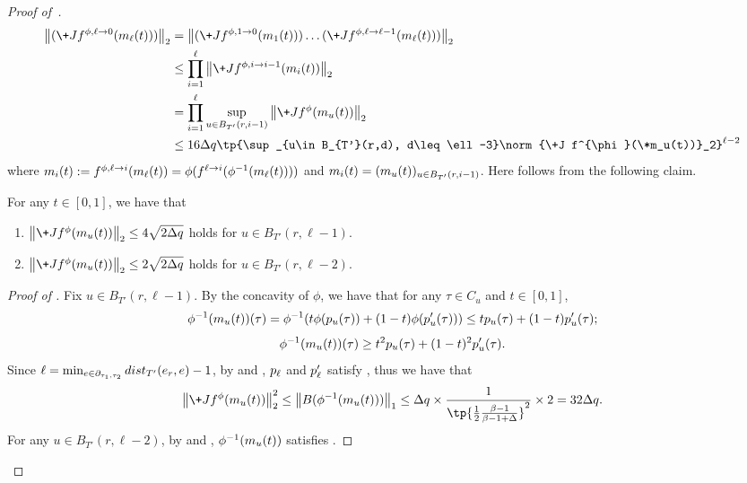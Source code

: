 \begin{proof}[Proof of~]
\begin{align}
    \nonumber \norm{ (\+J f^{\phi,\ell\ra 0}(\*m_\ell(t)))}_2 &= \norm{(\+J f^{\phi,1\ra 0}(\*m_1(t)))\dots (\+J f^{\phi,\ell\ra \ell-1}(\*m_\ell(t)))  }_2
    \\\nonumber &\leq \prod_{i=1}^{\ell}\norm{\+J f^{\phi,i\ra i-1}(\*m_i(t))}_2
    \\\nonumber &= \prod_{i=1}^{\ell}\sup_{u\in B_{T'}(r,i-1)}\norm{\+J f^{\phi}(\*m_u(t))}_2
    \\\label{eq:apply_trivial_bound} &\leq 16\Delta q \tp{\sup_{u\in B_{T'}(r,d), d\leq \ell-3}\norm{\+J f^{\phi}(\*m_u(t))}_2}^{\ell-2}
\end{align}
where $\*m_i(t) := f^{\phi,\ell\ra i}(\*m_\ell(t)) = \phi(f^{\ell\ra i}(\phi^{-1}(\*m_\ell(t))))$ and $\*m_i(t) = (\*m_u(t))_{u\in B_{T'}(r,i-1)}$.
Here  follows from the following claim.
\begin{claim}\label{claim:trivial_bound}
    For any $t\in [0,1]$, we have that
    \begin{enumerate}
    \item $\norm{\+J f^\phi(\*m_u(t))}_2 \leq 4\sqrt{2\Delta q}$ holds for $u\in B_{T'}(r,\ell-1)$.
    \item $\norm{\+J f^\phi(\*m_u(t))}_2 \leq 2\sqrt{2\Delta q}$ holds for $u\in B_{T'}(r,\ell-2)$.
    \end{enumerate}
\end{claim}
\begin{proof}[Proof of ]
    Fix $u\in B_{T'}(r,\ell-1)$.
    By the concavity of $\phi$, we have that for any $\tau \in C_u$ and $t\in [0,1]$,
    $$
        \phi^{-1}(\*m_u(t))(\tau)
        = \phi^{-1}(t \phi(\*p_u(\tau)) + (1-t)\phi(\*p_u'(\tau)))
        \leq t \*p_u(\tau) + (1-t)\*p_u'(\tau);
    $$
    $$
        \phi^{-1}(\*m_u(t))(\tau)
        \geq t^2\*p_u(\tau) + (1-t)^2\*p_u'(\tau).
    $$
    Since $\ell = \min_{e\in \partial_{\tau_1,\tau_2}} \-{dist}_{T'}(e_r,e) - 1$, by  and , $\*p_\ell$ and $\*p_\ell'$ satisfy , thus we have that
    $$
        \norm{\+J f^\phi(\*m_u(t))}_2^2 \leq \norm{\*B(\phi^{-1}(\*m_u(t)))}_1
        \leq \Delta q\times \frac{1}{\tp{\frac 12 \frac{\beta -1}{\beta -1 + \Delta}}^2}\times 2
        = 32 \Delta q.
    $$
    For any $u\in B_{T'}(r,\ell-2)$, by  and , $\phi^{-1}(\*m_u(t))$ satisfies .

\end{proof}
\end{proof}
